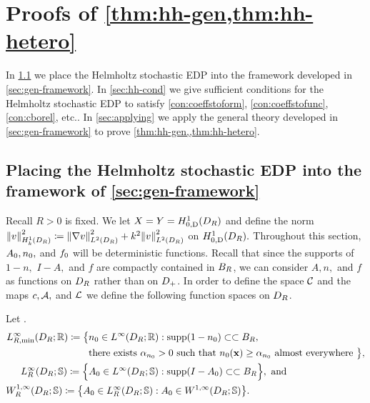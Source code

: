 \section[Proofs of Theorems \MakeLowercase{\ref{thm:hh-gen} and \ref{thm:hh-hetero}}]{Proofs of \cref{thm:hh-gen,thm:hh-hetero}}\label{sec:hhproof}
In \cref{sec:placing} we place the Helmholtz stochastic EDP into the framework developed in \cref{sec:gen-framework}. In \cref{sec:hh-cond} we give sufficient conditions for the Helmholtz stochastic EDP to satisfy  \ref{con:coeffstoform}, \ref{con:coeffstofunc}, \ref{con:cborel}, etc.. In \cref{sec:applying} we apply the general theory developed in \cref{sec:gen-framework} to prove \cref{thm:hh-gen,,thm:hh-hetero}.

\subsection{Placing the Helmholtz stochastic EDP into the framework of \cref{sec:gen-framework}}\label{sec:placing}
Recall $R>0$ is fixed. We let $X=Y=\HozDDR$ and define the norm $\NHokDR{v}^2 \de \NLtDR{\grad v}^2 + k^2 \NLtDR{v}^2$ on $\HozDDR.$ Throughout this section, $A_{0},n_{0},$ and $f_{0}$ will be deterministic functions. Recall that since the supports of $1-n,$ $I-A,$ and $f$ are compactly contained in $B_{R}$, we can consider $A, n,$ and $f$ as functions on $D_{R}$ rather than on $D_{+}$. In order to define the space $\mathcal C$ and the maps $c,\mathcal A,$ and $\mathcal L$ we define the following function spaces on $D_{R}$.

\label{def:compsuppspace}
Let
\beqs
\LtRDR \de \set{\fz \in \LtDR \st \supp\mleft(\fz\mright) \compcont \BR}.
\eeqs
\begin{align*}
\LiRminDRRR \de \big\{&\nz \in \LiDRRR \st\supp\mleft(1-\nz\mright) \compcont \BR,\\
&\text{there exists } \alphanz > 0 \text{ such that } \nz(\bx) \geq \alphanz \text{ almost everywhere }\big\},\\
\hspace{-3cm}\LiRminDRRRdtd \de \Big\{&\Az \in \LiDRRRdtd \st \supp\mleft(I-\Az\mright) \compcont \BR\Big\},\text{ and}\\
&\hspace{-3cm}\WoiRminDRRRdtd \de \set{\Az \in \LiRminDRRRdtd \st\Az \in \WoiDRRRdtd}.
\end{align*}
\ede

